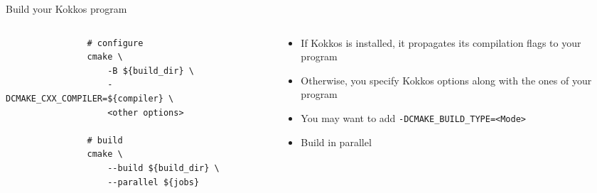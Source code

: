 \documentclass[
    aspectratio=169,
]{beamer}
\begin{document}
\begin{frame}[fragile]{Build your Kokkos program}
    \begin{columns}
        \begin{column}{0.6\linewidth}
            \begin{verbatim}
                # configure
                cmake \
                    -B ${build_dir} \
                    -DCMAKE_CXX_COMPILER=${compiler} \
                    <other options>

                # build
                cmake \
                    --build ${build_dir} \
                    --parallel ${jobs}
            \end{verbatim}
        \end{column}
        \begin{column}{0.4\linewidth}
            \begin{itemize}
                \item If Kokkos is installed, it propagates its compilation flags to your program
                \item Otherwise, you specify Kokkos options along with the ones of your program
                \item You may want to add \texttt{-DCMAKE\_BUILD\_TYPE=<Mode>}
                \item Build in parallel
            \end{itemize}
        \end{column}
    \end{columns}
\end{frame}

\end{document}
